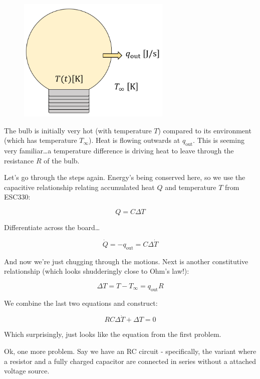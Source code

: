 \documentclass[
  letterpaper,
  DIV=11,
  numbers=noendperiod]{scrreprt}
\begin{document}
\begin{figure}

{\centering \includegraphics[width=0.65\textwidth,height=\textheight]{figs/2_bulb.png}

}

\end{figure}

The bulb is initially very hot (with temperature \(T\)) compared to its
environment (which has temperature \(T_\infty\)). Heat is flowing
outwards at \(q_\text{out}\). This is seeming very familiar\ldots a
temperature difference is driving heat to leave through the resistance
\(R\) of the bulb.

Let's go through the steps again. Energy's being conserved here, so we
use the capacitive relationship relating accumulated heat \(Q\) and
temperature \(T\) from ESC330:

\[ Q = C \Delta T\]

Differentiate across the board\ldots{}

\[ \dot{Q} = -q_\text{out} = C \Delta \dot{T} \]

And now we're just chugging through the motions. Next is another
constitutive relationship (which looks shudderingly close to Ohm's
law!):

\[\Delta T = T - T_\infty = q_\text{out} R\]

We combine the last two equations and construct:

\[\boxed{RC \Delta \dot{T} + \Delta T = 0}\]

Which surprisingly, just looks like the equation from the first problem.

Ok, one more problem. Say we have an RC circuit - specifically, the
variant where a resistor and a fully charged capacitor are connected in
series without a attached voltage source.
\end{document}
